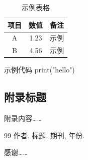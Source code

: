 \documentclass[linux]{hustreport} %
\begin{document}
\begin{table}[H]
    \centering
    \caption{示例表格}
    \begin{tabular}{ccc}
        \toprule
        项目 & 数值 & 备注 \\
        \midrule
        A & 1.23 & 示例 \\
        B & 4.56 & 示例 \\
        \bottomrule
    \end{tabular}
\end{table}

\begin{codeblock}[python]{示例代码}
print("hello")
\end{codeblock}




\begin{appendixblock}
\section{附录标题}
附录内容……
\end{appendixblock}


\begin{thebibliography}{99}
 作者. 标题. 期刊, 年份.
\end{thebibliography}

\begin{acknowledgement}
感谢……
\end{acknowledgement}
\end{document}
